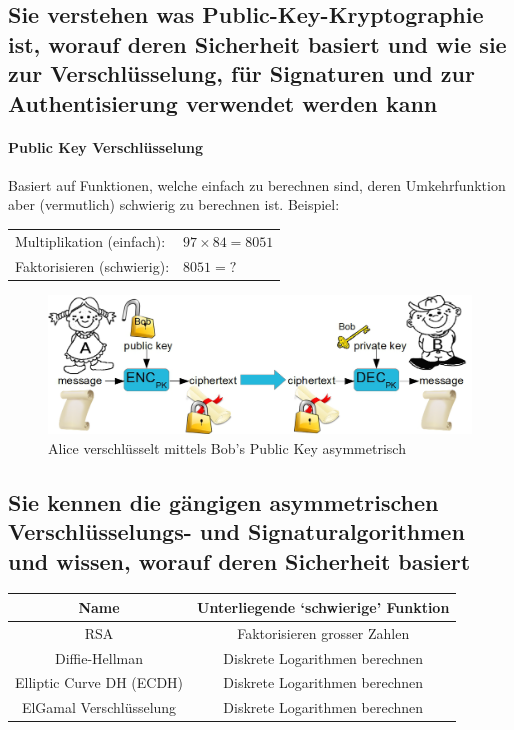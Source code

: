 \documentclass[10pt,a4paper]{article}
\begin{document}
\subsection*{Sie verstehen was Public-Key-Kryptographie ist, worauf deren Sicherheit basiert und wie sie zur Verschlüsselung, für Signaturen und zur Authentisierung verwendet werden kann}

\paragraph*{Public Key Verschlüsselung}\label{para:Public Key Encryption}Basiert auf Funktionen, welche einfach zu berechnen sind, deren Umkehrfunktion aber (vermutlich) schwierig zu berechnen ist.
Beispiel:\newline %
\noindent
\begin{tabular}{|ll|}
    \hline
    Multiplikation (einfach):&$97\times84=8051$\\
    Faktorisieren (schwierig):&$8051=?$\\
    \hline
\end{tabular}

\begin{figure}[H]
    \begin{center}
    \includegraphics[width=14cm]{images/publickey.png}
    \caption{Alice verschlüsselt mittels Bob's Public Key asymmetrisch}
    \label{pke}
    \end{center}
\end{figure}

\subsection*{Sie kennen die gängigen asymmetrischen Verschlüsselungs- und Signaturalgorithmen und wissen, worauf deren Sicherheit basiert}
\begin{tabular}{|c|c|}
    \hline
        Name&Unterliegende `schwierige' Funktion\\
        \hline
        RSA&Faktorisieren grosser Zahlen\\
        Diffie-Hellman&Diskrete Logarithmen berechnen\\
        Elliptic Curve DH (ECDH) &Diskrete Logarithmen berechnen\\
        ElGamal Verschlüsselung&Diskrete Logarithmen berechnen\\
    \hline
\end{tabular}
\end{document}
